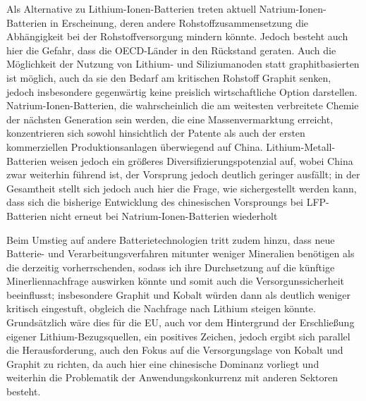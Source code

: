 \documentclass[12pt,a4paper,oneside]{book} %
\begin{document}
{{ Als Alternative zu Lithium-Ionen-Batterien treten aktuell Natrium-Ionen-Batterien in Erscheinung,\autocite{Sodium as a Green Substitute for Lithium in Batteries, April 25, 2024, Physics 17, 73 } deren andere Rohstoffzusammensetzung die Abhängigkeit bei der Rohstoffversorgung mindern könnte. Jedoch besteht auch hier die Gefahr, dass die OECD-Länder in den Rückstand geraten.\autocite{McBrdige, S. 3} 
 Auch die Möglichkeit der Nutzung von Lithium- und Siliziumanoden statt graphitbasierten ist möglich, auch da sie den Bedarf am kritischen Rohstoff Graphit senken, jedoch insbesondere gegenwärtig keine preislich wirtschaftliche Option darstellen.\autocite{McBridge, S. 3}
 \\
  Natrium-Ionen-Batterien, die wahrscheinlich die am weitesten verbreitete Chemie der nächsten Generation sein werden, die eine Massenvermarktung erreicht,\autocite{Dunn, J., Slattery, M., Kendall, A., Ambrose, H., Shen, S., 2021. Circularity of lithium-ion battery materials in electric vehicles. Environ} konzentrieren sich sowohl hinsichtlich der Patente als auch der ersten kommerziellen Produktionsanlagen überwiegend auf China. Lithium-Metall-Batterien weisen jedoch ein größeres Diversifizierungspotenzial auf, wobei China zwar weiterhin führend ist, der Vorsprung jedoch deutlich geringer ausfällt; in der Gesamtheit stellt sich jedoch auch hier die Frage, wie sichergestellt werden kann, dass sich die bisherige Entwicklung des chinesischen Vorsproungs bei LFP-Batterien nicht erneut bei Natrium-Ionen-Batterien wiederholt\autocite{Mcbrdige, S. 16}
 
 Beim Umstieg auf andere Batterietechnologien tritt zudem hinzu, dass neue Batterie- und Verarbeitungsverfahren mitunter weniger Mineralien benötigen als die derzeitig vorherrschenden, sodass ich ihre Durchsetzung auf die künftige Minerliennachfrage auswirken könnte und somit auch die Versorgunssicherheit beeinflusst; insbesondere Graphit und Kobalt würden dann als deutlich weniger kritisch eingestuft, obgleich die Nachfrage nach Lithium steigen könnte.\autocite{McBrdige, S. 25} Grundsätzlich wäre dies für die EU, auch vor dem Hintergrund der Erschließung eigener Lithium-Bezugsquellen, ein positives Zeichen, jedoch ergibt sich parallel die Herausforderung, auch den Fokus auf die Versorgungslage von Kobalt und Graphit zu richten, da auch hier eine chinesische Dominanz vorliegt\autocite{McBrdige, S. 25} und weiterhin die Problematik der Anwendungskonkurrenz mit anderen Sektoren besteht.

}}
\end{document}
